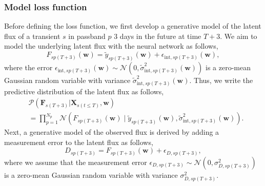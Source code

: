\documentclass[fleqn,usenatbib]{mnras}
\begin{document}
\subsubsection{Model loss function}
\label{sec:NN_loss_function}
Before defining the loss function, we first develop a generative model of the latent flux of a transient $s$ in passband $p$ 3 days in the future at time $T+3$. We aim to model the underlying latent flux with the neural network as follows,
\begin{equation}
   F_{sp(T+3)}(\bm{w}) = \tilde{y}_{sp(T+3)}(\bm{w}) + \epsilon_{\mathrm{int},sp(T+3)}(\bm{w}),
\label{eq:DNN_latent_flux}
\end{equation}
where the error $\epsilon_{\mathrm{int},sp(T+3)}(\bm{w}) \sim \mathcal{N}\left(0, \tilde{\sigma}^2_{\mathrm{int},sp(T+3)}(\bm{w})\right)$ is a zero-mean Gaussian random variable with variance $\tilde{\sigma}^2_{\mathrm{int},sp(T+3)}(\bm{w})$.
Thus, we write the predictive distribution of the latent flux as follows,
\begin{equation}
    \begin{split}
      &\mathcal{P}(\bm{F}_{s(T+3)}|\bm{X}_{s(t \le T)}, \bm{w}) \\
      &= \prod^{N_p}_{p=1} \mathcal{N} \left( F_{sp(T+3)}(\bm{w}) \mid \tilde{y}_{sp(T+3)}(\bm{w}), \tilde{\sigma}^2_{\mathrm{int},sp(T+3)}(\bm{w}) \right).
    \end{split}
\label{eq:posterior_predictive}
\end{equation}
Next, a generative model of the observed flux is derived by adding a measurement error to the latent flux as follows,
\begin{equation}
    D_{sp(T+3)} = F_{sp(T+3)}(\bm{w}) + \epsilon_{D, sp(T+3)},
\label{eq:generative_model_data_DNN}
\end{equation}
where we assume that the measurement error $\epsilon_{D, sp(T+3)} \sim \mathcal{N}(0,\sigma^2_{D,{sp(T+3)}})$ is a zero-mean Gaussian random variable with variance $\sigma^2_{D,{sp(T+3)}}$.
\end{document}
